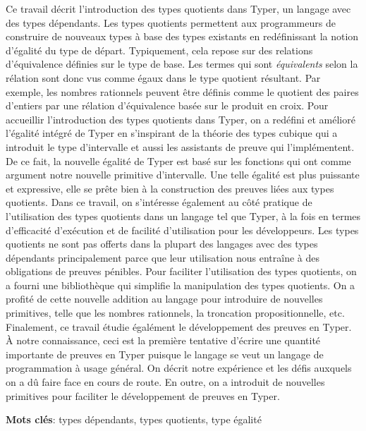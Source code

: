 \documentclass[12pt,twoside,maitrise]{dms}
\theoremstyle{definition}
\numberwithin{equation}{section}
\numberwithin{table}{chapter}
\numberwithin{figure}{chapter}
\begin{document}
Ce travail décrit l'introduction des types quotients dans
Typer\cite{monnier2019typer}, un langage avec des types dépendants. Les types
quotients permettent aux programmeurs de construire de nouveaux types à base des
types existants en redéfinissant la notion d'égalité du type de départ.
Typiquement, cela repose sur des relations d'équivalence définies sur le type de
base. Les termes qui sont \emph{équivalents} selon la rélation sont donc vus
comme égaux dans le type quotient résultant. Par exemple, les nombres rationnels
peuvent être définis comme le quotient des paires d'entiers par une rélation
d'équivalence basée sur le produit en croix. Pour accueillir l'introduction des
types quotients dans Typer, on a redéfini et amélioré l'égalité intégré de Typer
en s'inspirant de la théorie des types cubique qui a introduit le type
d'intervalle et aussi les assistants de preuve qui l'implémentent. De ce fait,
la nouvelle égalité de Typer est basé sur les fonctions qui ont comme argument
notre nouvelle primitive d'intervalle. Une telle égalité est plus puissante et
expressive, elle se prête bien à la construction des preuves liées aux types
quotients. Dans ce travail, on s'intéresse également au côté pratique de
l'utilisation des types quotients dans un langage tel que Typer, à la fois en
termes d'efficacité d'exécution et de facilité d'utilisation pour les
développeurs. Les types quotients ne sont pas offerts dans la plupart des
langages avec des types dépendants principalement parce que leur utilisation
nous entraîne à des obligations de preuves pénibles. Pour faciliter
l'utilisation des types quotients, on a fourni une bibliothèque qui simplifie la
manipulation des types quotients. On a profité de cette nouvelle addition au
langage pour introduire de nouvelles primitives, telle que les nombres
rationnels, la troncation propositionnelle, etc. Finalement, ce travail étudie
égalément le développement des preuves en Typer. À notre connaissance, ceci est
la première tentative d'écrire une quantité importante de preuves en Typer
puisque le langage se veut un langage de programmation à usage général. On
décrit notre expérience et les défis auxquels on a dû faire face en cours de
route. En outre, on a introduit de nouvelles primitives pour faciliter le
développement de preuves en Typer.

\textbf{Mots clés}: types dépendants, types quotients, type égalité

\end{document}
